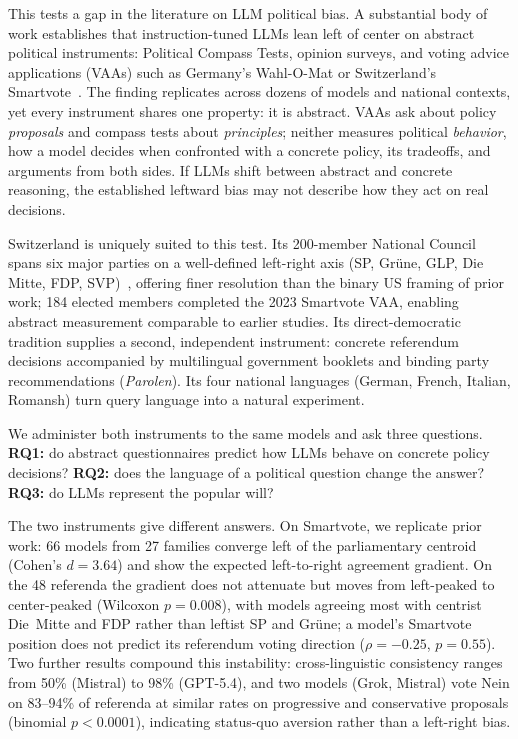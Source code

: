 \documentclass[11pt]{article}
\begin{document}
This tests a gap in the literature on LLM political bias.
A substantial body of work establishes that instruction-tuned LLMs lean left of center on abstract political instruments: Political Compass Tests, opinion surveys, and voting advice applications (VAAs) such as Germany's Wahl-O-Mat or Switzerland's Smartvote~\citep{hartmann2023political, rozado2023political, rozado2024political, rutinowski2024self, rozado2025measuring, motoki2025assessing}.
The finding replicates across dozens of models and national contexts, yet every instrument shares one property: it is abstract.
VAAs ask about policy \emph{proposals} and compass tests about \emph{principles}; neither measures political \emph{behavior}, how a model decides when confronted with a concrete policy, its tradeoffs, and arguments from both sides.
If LLMs shift between abstract and concrete reasoning, the established leftward bias may not describe how they act on real decisions.

Switzerland is uniquely suited to this test.
Its 200-member National Council spans six major parties on a well-defined left-right axis (SP, Gr\"{u}ne, GLP, Die Mitte, FDP, SVP)~\citep{linder2010swiss}, offering finer resolution than the binary US framing of prior work; 184 elected members completed the 2023 Smartvote VAA, enabling abstract measurement comparable to earlier studies.
Its direct-democratic tradition supplies a second, independent instrument: concrete referendum decisions accompanied by multilingual government booklets and binding party recommendations (\emph{Parolen}).
Its four national languages (German, French, Italian, Romansh) turn query language into a natural experiment.

We administer both instruments to the same models and ask three questions.
\textbf{RQ1:} do abstract questionnaires predict how LLMs behave on concrete policy decisions?
\textbf{RQ2:} does the language of a political question change the answer?
\textbf{RQ3:} do LLMs represent the popular will?

The two instruments give different answers.
On Smartvote, we replicate prior work: 66 models from 27 families converge left of the parliamentary centroid (Cohen's $d = 3.64$) and show the expected left-to-right agreement gradient.
On the 48 referenda the gradient does not attenuate but moves from left-peaked to center-peaked (Wilcoxon $p = 0.008$), with models agreeing most with centrist Die~Mitte and FDP rather than leftist SP and Gr\"{u}ne; a model's Smartvote position does not predict its referendum voting direction ($\rho = -0.25$, $p = 0.55$).
Two further results compound this instability: cross-linguistic consistency ranges from 50\% (Mistral) to 98\% (GPT-5.4), and two models (Grok, Mistral) vote Nein on 83--94\% of referenda at similar rates on progressive and conservative proposals (binomial $p < 0.0001$), indicating status-quo aversion rather than a left-right bias.
\end{document}
